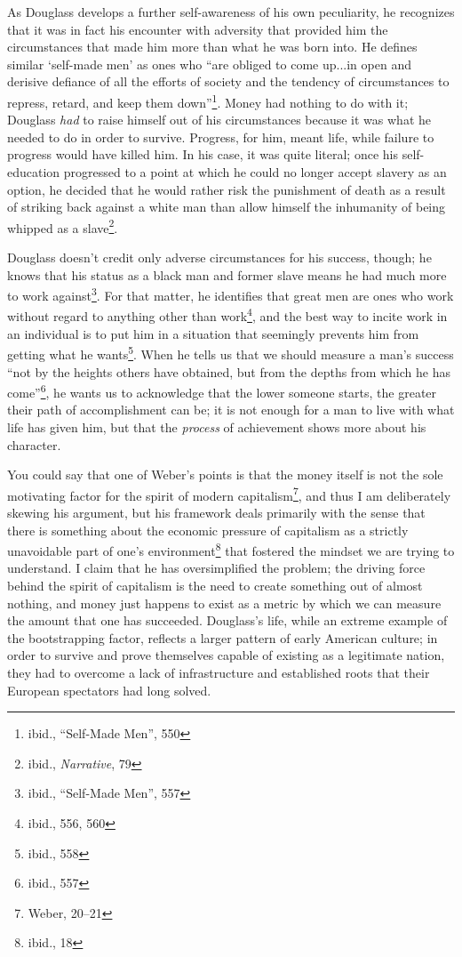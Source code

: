 As Douglass develops a further self-awareness of his own peculiarity, he
recognizes that it was in fact his encounter with adversity that provided him
the circumstances that made him more than what he was born into. He defines
similar `self-made men' as ones who ``are obliged to come up...in open and
derisive defiance of all the efforts of society and the tendency of
circumstances to repress, retard, and keep them down''\footnote{ibid.,
``Self-Made Men'', 550}. Money had nothing to do with it; Douglass \textit{had}
to raise himself out of his circumstances because it was what he needed to do in
order to survive.  Progress, for him, meant life, while failure to progress
would have killed him. In his case, it was quite literal; once his
self-education progressed to a point at which he could no longer accept slavery
as an option, he decided that he would rather risk the punishment of death as a
result of striking back against a white man than allow himself the inhumanity of
being whipped as a slave\footnote{ibid., \textit{Narrative}, 79}.

Douglass doesn't credit only adverse circumstances for his success, though; he
knows that his status as a black man and former slave means he had much more to
work against\footnote{ibid., ``Self-Made Men'', 557}. For that matter, he
identifies that great men are ones who work without regard to anything other
than work\footnote{ibid., 556, 560}, and the best way to incite work in an
individual is to put him in a situation that seemingly prevents him
from getting what he wants\footnote{ibid., 558}. When he tells us that we should
measure a man's success ``not by the heights others have obtained, but from the
depths from which he has come''\footnote{ibid., 557}, he wants us to acknowledge
that the lower someone starts, the greater their path of accomplishment can be;
it is not enough for a man to live with what life has given him, but that the
\textit{process} of achievement shows more about his character.

You could say that one of Weber's points is that the money itself is not the
sole motivating factor for the spirit of modern capitalism\footnote{Weber,
20--21}, and thus I am deliberately skewing his argument, but his framework
deals primarily with the sense that there is something about the economic
pressure of capitalism as a strictly unavoidable part of one's
environment\footnote{ibid., 18} that fostered the mindset we are trying to
understand. I claim that he has oversimplified the problem; the driving force
behind the spirit of capitalism is the need to create something out of almost
nothing, and money just happens to exist as a metric by which we can measure the
amount that one has succeeded. Douglass's life, while an extreme example of the
bootstrapping factor, reflects a larger pattern of early American culture; in
order to survive and prove themselves capable of existing as a legitimate
nation, they had to overcome a lack of infrastructure and established roots that
their European spectators had long solved.
